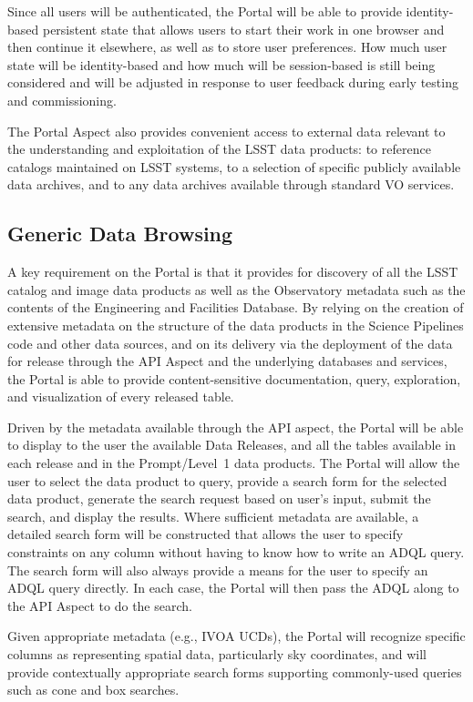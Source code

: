 Since all users will be authenticated, the Portal will be able to provide identity-based persistent state that allows users to start their work in one browser and then continue it elsewhere, as well as to store user preferences.
How much user state will be identity-based and how much will be session-based is still being considered and will be adjusted in response to user feedback during early testing and commissioning.

The Portal Aspect also provides convenient access to external data relevant to the understanding and exploitation of the LSST data products:
to reference catalogs maintained on LSST systems,
to a selection of specific publicly available data archives,
and to any data archives available through standard VO services.

\subsection{Generic Data Browsing}\label{generic-data-browsing}

A key requirement on the Portal is that it provides for discovery of all the LSST catalog and image data products as well as the Observatory metadata such as the contents of the Engineering and Facilities Database.
By relying on the creation of extensive metadata on the structure of the data products in the Science Pipelines code and other data sources, and on its delivery via the deployment of the data for release through the API Aspect and the underlying databases and services, the Portal is able to provide content-sensitive documentation, query, exploration, and visualization of every released table.

Driven by the metadata available through the API aspect, the Portal will be able to display to the user the available Data Releases, and all the tables available in each release and in the Prompt/Level~1 data products.
The Portal will allow the user to select the data product to query, provide a search form for the selected data product, generate the search request based on user's input, submit the search, and display the results.
Where sufficient metadata are available, a detailed search form will be constructed that allows the user to specify constraints on any column without having to know how to write an ADQL query.
The search form will also always provide a means for the user to specify an ADQL query directly.
In each case, the Portal will then pass the ADQL along to the API Aspect to do the search.

Given appropriate metadata (e.g., IVOA UCDs), the Portal will recognize specific columns as representing spatial data, particularly sky coordinates, and will provide contextually appropriate search forms supporting commonly-used queries such as cone and box searches.

